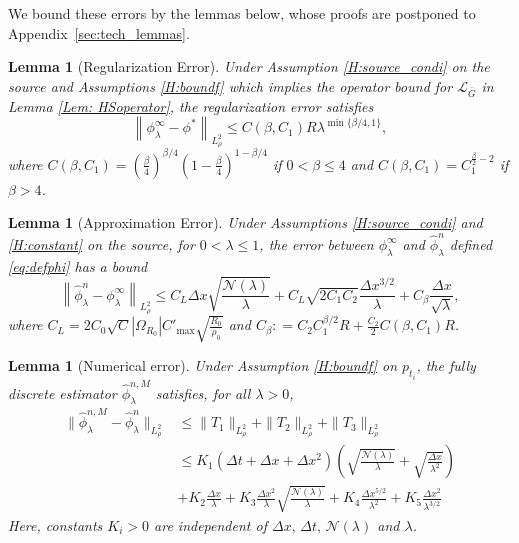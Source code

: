 \documentclass[12pt]{article}
\newtheorem{lemma}[theorem]{Lemma}
\numberwithin{equation}{section}
\numberwithin{theorem}{section}
\begin{document}
We bound these errors by the lemmas below, whose proofs are postponed to Appendix~\ref{sec:tech_lemmas}. 


\begin{lemma}[Regularization Error] \label{lem: regerror}
Under Assumption \eqref{H:source_condi} on the source and Assumptions \ref{H:boundf} which implies the operator bound for $\mathcal{L}_{\bar{G}}$ in Lemma \ref{Lem: HSoperator}, the regularization error satisfies
$$
\left\|{\phi}_\lambda^{\infty}-\phi^*\right\|_{L_\rho^2} \leq C\left(\beta, C_1\right)  R  \lambda^{\min \{\beta / 4,1\}},
$$
where $C\left(\beta, C_1\right) = \left(\frac{\beta}{4}\right)^{\beta / 4}\left(1-\frac{\beta}{4}\right)^{1-\beta / 4}$ if $0<\beta\leq 4$ and $C\left(\beta, C_1\right)= C_1^{\frac{\beta}{2}-2}$ if $\beta>4$. 

\end{lemma}



\begin{lemma}[Approximation Error] \label{lem:approxerror}
Under Assumptions \eqref{H:source_condi} and \ref{H:constant} on the source, for $0<\lambda \leq 1$,  the error between ${\phi}_\lambda^{\infty}$ and $\hat{\phi}_\lambda^n$ defined \eqref{eq:defphi} has a bound 
$$
\left\|\hat{\phi}_\lambda^n-\phi_\lambda^{\infty}\right\|_{L_\rho^2} \leq C_L \Delta x \sqrt{\frac{\mathcal{N}(\lambda)}{\lambda}}+C_L \sqrt{2 C_1 C_2} \frac{\Delta x^{3 / 2}}{\lambda}+C_\beta\frac{\Delta x}{\sqrt{\lambda}},
$$
where $C_L = 2 C_0\sqrt{C}\left|\Omega_{R_0}\right| C'_{\max} \sqrt{\frac{R_0}{\rho_{0}}}$ and $C_\beta: = C_2 C_1^{\beta / 2} R + \frac{C_2}{2} C\left(\beta, C_1\right)R$. 
\end{lemma}

\begin{lemma}[Numerical error]\label{lem:numerroroperator}
Under Assumption \ref{H:boundf} on $p_{t_i}$, the fully discrete estimator
$\hat{\phi}_\lambda^{n,M}$ satisfies, for all $\lambda>0$,
$$
\begin{aligned}
\|\hat{\phi}_\lambda^{n,M}-\hat{\phi}_\lambda^n\|_{L^2_\rho}
&\le \|T_1\|_{L^2_\rho} + \|T_2\|_{L^2_\rho} + \|T_3\|_{L^2_\rho} \\
& \leq K_1\left(\Delta t+\Delta x+\Delta x^2\right)\left(\sqrt{\frac{\mathcal{N}(\lambda)}{\lambda}}+\sqrt{\frac{\Delta x}{\lambda^2}}\right) \\ & +K_2 \frac{\Delta x}{\lambda}+K_3 \frac{\Delta x^2}{\lambda} \sqrt{\frac{\mathcal{N}(\lambda)}{\lambda}}+K_4 \frac{\Delta x^{5 / 2}}{\lambda^2} + K_5\frac{\Delta x^{2}}{\lambda^{3/2}}
\end{aligned}
$$
Here, constants $K_i>0$ are independent of $\Delta x,\,\Delta t,\,\mathcal{N}(\lambda)$ and $\lambda$.
\end{lemma}
\end{document}
